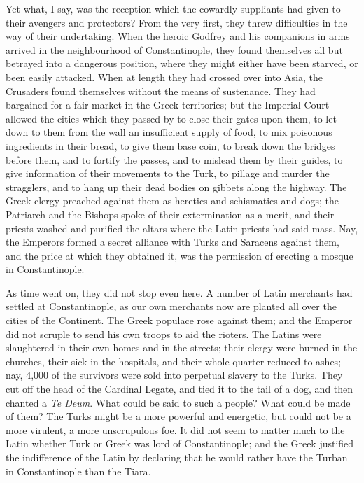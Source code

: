 Yet what, I say, was the
reception which the cowardly suppliants had given to their avengers
and protectors? From the very first, they threw difficulties in the
way of their undertaking. When the heroic Godfrey and his companions
in arms arrived in the neighbourhood of Constantinople, they found
themselves all but betrayed into a dangerous position, where they
might either have been starved, or been easily attacked. When at
length they had crossed over into Asia, the Crusaders found themselves
without the means of sustenance. They had bargained for a fair market
in the Greek territories; but the Imperial Court allowed the cities
which they passed by to close their gates upon them, to let down to
them from the wall an insufficient supply of food, to mix poisonous ingredients in their bread, to give them base coin, to break
down the bridges before them, and to fortify the passes, and to
mislead them by their guides, to give information of their movements
to the Turk, to pillage and murder the stragglers, and to hang up
their dead bodies on gibbets along the highway. The Greek clergy
preached against them as heretics and schismatics and dogs; the
Patriarch and the Bishops spoke of their extermination as a merit, and
their priests washed and purified the altars where the Latin priests
had said mass. Nay, the Emperors formed a secret alliance with Turks
and Saracens against them, and the price at which they obtained it,
was the permission of erecting a mosque in Constantinople.

As time went on, they did not
stop even here. A number of Latin merchants had settled at
Constantinople, as our own merchants now are planted all over the
cities of the Continent. The Greek populace rose against them; and the
Emperor did not scruple to send his own troops to aid the rioters. The
Latins were slaughtered in their own homes and in the streets; their
clergy were burned in the churches, their sick in the hospitals, and
their whole quarter reduced to ashes; nay, 4,000 of the survivors were
sold into perpetual slavery to the Turks. They cut off the head of the
Cardinal Legate, and tied it to the tail of a dog, and then chanted a \emph{Te
Deum}. What could be said to such a people? What could be made of
them? The Turks might be a more powerful and energetic, but could not
be a more virulent, a more unscrupulous foe. It did not seem to matter
much to the Latin whether Turk or Greek was lord of Constantinople;
and the Greek justified the indifference of the Latin by declaring
that he would rather have the Turban in Constantinople than the Tiara.

